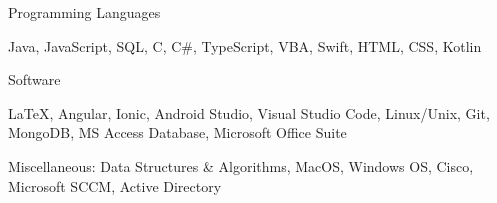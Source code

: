 \begin{cventries}
  \cventry
    {Programming Languages}
    { }
    { }
    { }
    {
      \begin{cvitems}
        \item {Java, JavaScript, SQL, C, C\#, TypeScript, VBA, Swift, HTML, CSS, Kotlin}
      \end{cvitems}
    }
  \cventry
    {Software}
    { }
    { }
    { }
    {
      \begin{cvitems}
        \item {LaTeX, Angular, Ionic, Android Studio, Visual Studio Code, Linux/Unix, Git, MongoDB, MS Access Database, Microsoft Office Suite}
        \item {Miscellaneous: Data Structures \& Algorithms, MacOS, Windows OS, Cisco, Microsoft SCCM, Active Directory }
      \end{cvitems}
    }
\end{cventries}
